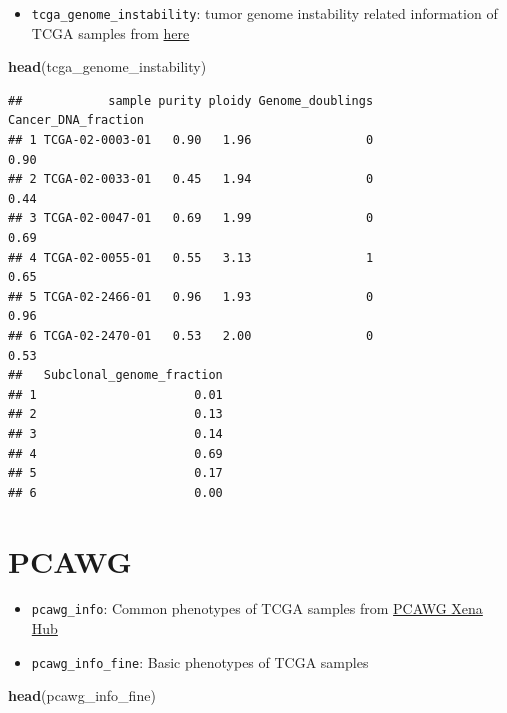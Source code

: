 \documentclass[
]{book}
\newenvironment{Shaded}{\begin{snugshade}}{\end{snugshade}}
\newcommand{\FunctionTok}[1]{\textcolor[rgb]{0.13,0.29,0.53}{\textbf{#1}}}
\newcommand{\NormalTok}[1]{#1}
\providecommand{\tightlist}{%
  \setlength{\itemsep}{0pt}\setlength{\parskip}{0pt}}
\begin{document}
\begin{itemize}
\tightlist
\item
  \texttt{tcga\_genome\_instability}: tumor genome instability related information of TCGA samples from \href{https://gdc.cancer.gov/about-data/publications/PanCanStemness-2018}{here}
\end{itemize}

\begin{Shaded}
\begin{Highlighting}[]
\FunctionTok{head}\NormalTok{(tcga\_genome\_instability)}
\end{Highlighting}
\end{Shaded}

\begin{verbatim}
##            sample purity ploidy Genome_doublings Cancer_DNA_fraction
## 1 TCGA-02-0003-01   0.90   1.96                0                0.90
## 2 TCGA-02-0033-01   0.45   1.94                0                0.44
## 3 TCGA-02-0047-01   0.69   1.99                0                0.69
## 4 TCGA-02-0055-01   0.55   3.13                1                0.65
## 5 TCGA-02-2466-01   0.96   1.93                0                0.96
## 6 TCGA-02-2470-01   0.53   2.00                0                0.53
##   Subclonal_genome_fraction
## 1                      0.01
## 2                      0.13
## 3                      0.14
## 4                      0.69
## 5                      0.17
## 6                      0.00
\end{verbatim}

\section{PCAWG}\label{pcawg}

\begin{itemize}
\tightlist
\item
  \texttt{pcawg\_info}: Common phenotypes of TCGA samples from \href{https://xenabrowser.net/datapages/?cohort=PCAWG\%20(specimen\%20centric)&removeHub=https\%3A\%2F\%2Fxena.treehouse.gi.ucsc.edu\%3A443}{PCAWG Xena Hub}
\item
  \texttt{pcawg\_info\_fine}: Basic phenotypes of TCGA samples
\end{itemize}

\begin{Shaded}
\begin{Highlighting}[]
\FunctionTok{head}\NormalTok{(pcawg\_info\_fine)}
\end{Highlighting}
\end{Shaded}
\end{document}
